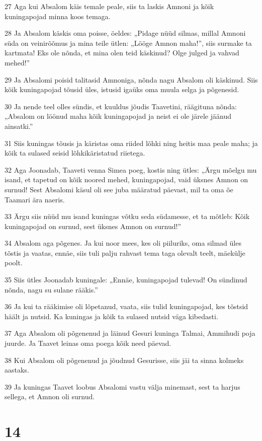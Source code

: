 \par 27 Aga kui Absalom käis temale peale, siis ta laskis Amnoni ja kõik kuningapojad minna koos temaga.
\par 28 Ja Absalom käskis oma poisse, öeldes: „Pidage nüüd silmas, millal Amnoni süda on veinirõõmus ja mina teile ütlen: „Lööge Amnon maha!”, siis surmake ta kartmata! Eks ole nõnda, et mina olen teid käskinud? Olge julged ja vahvad mehed!”
\par 29 Ja Absalomi poisid talitasid Amnoniga, nõnda nagu Absalom oli käskinud. Siis kõik kuningapojad tõusid üles, istusid igaüks oma muula selga ja põgenesid.
\par 30 Ja nende teel olles sündis, et kuuldus jõudis Taavetini, räägituna nõnda: „Absalom on löönud maha kõik kuningapojad ja neist ei ole järele jäänud ainsatki.”
\par 31 Siis kuningas tõusis ja käristas oma riided lõhki ning heitis maa peale maha; ja kõik ta sulased seisid lõhkikäristatud riietega.
\par 32 Aga Joonadab, Taaveti venna Simea poeg, kostis ning ütles: „Ärgu mõelgu mu isand, et tapetud on kõik noored mehed, kuningapojad, vaid üksnes Amnon on surnud! Sest Absalomi käsul oli see juba määratud päevast, mil ta oma õe Taamari ära naeris.
\par 33 Ärgu siis nüüd mu isand kuningas võtku seda südamesse, et ta mõtleb: Kõik kuningapojad on surnud, sest üksnes Amnon on surnud!”
\par 34 Absalom aga põgenes. Ja kui noor mees, kes oli piiluriks, oma silmad üles tõstis ja vaatas, ennäe, siis tuli palju rahvast tema taga olevalt teelt, mäekülje poolt.
\par 35 Siis ütles Joonadab kuningale: „Ennäe, kuningapojad tulevad! On sündinud nõnda, nagu su sulane rääkis.”
\par 36 Ja kui ta rääkimise oli lõpetanud, vaata, siis tulid kuningapojad, kes tõstsid häält ja nutsid. Ka kuningas ja kõik ta sulased nutsid väga kibedasti.
\par 37 Aga Absalom oli põgenenud ja läinud Gesuri kuninga Talmai, Ammihudi poja juurde. Ja Taavet leinas oma poega kõik need päevad.
\par 38 Kui Absalom oli põgenenud ja jõudnud Gesurisse, siis jäi ta sinna kolmeks aastaks.
\par 39 Ja kuningas Taavet loobus Absalomi vastu välja minemast, sest ta harjus sellega, et Amnon oli surnud.

\chapter{14}

